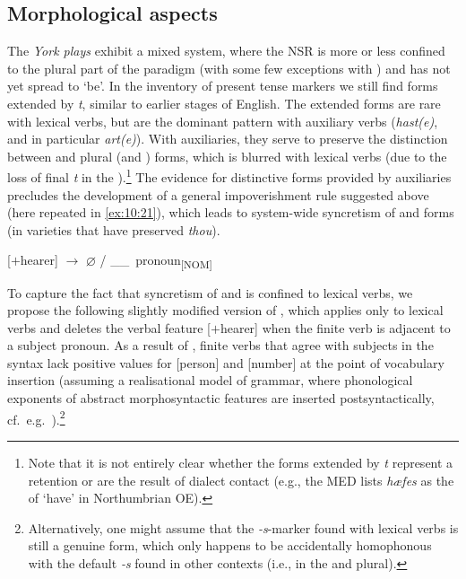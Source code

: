 \documentclass[output=paper]{langsci/langscibook}
\begin{document}
\subsection{Morphological aspects}
The \emph{York plays} exhibit a mixed system, where the \gls{NSR} is more or less confined to the plural part of the paradigm (with
some few exceptions with \Fsg{}) and has not yet spread to `be'. In the
inventory of present tense markers we still find \Ssg{} forms extended by
\emph{t}, similar to earlier stages of English. The extended forms are rare
with lexical verbs, but are the dominant pattern with auxiliary
verbs (\emph{hast(e)}, and in particular \emph{art(e)}). With auxiliaries, they
serve to preserve the distinction between \Ssg{} and plural (and \Tsg{}) forms,
which is blurred with lexical verbs (due to the loss of final \emph{t} in the
\Ssg{}).\footnote{Note that it is not entirely clear whether the \Ssg{} forms
extended by \emph{t} represent a retention or are the result of dialect contact
(e.g., the MED lists \emph{hæfes} as the \Ssg{} of `have' in Northumbrian
\gls{OE}).} The evidence for distinctive \Ssg{} forms provided by auxiliaries
precludes the development of a general impoverishment rule
suggested above (here repeated in \ref{ex:10:21}), which leads to system-wide syncretism
of \Ssg{} and \Tsg{} forms (in varieties that have preserved \emph{thou}).

\ea\label{ex:10:21}
\mbox{[$+$hearer]} {$\rightarrow$ $\varnothing$} / \_\_\ pronoun\textsubscript{[NOM]}
\z

To capture the fact that syncretism of \Ssg{} and \Tsg{} is confined to lexical
verbs, we propose the following slightly modified version of , which
applies only to lexical verbs and deletes the verbal  feature
[$+$hearer] when the finite verb is adjacent to a \Ssg{} subject pronoun. As a
result of , finite verbs that agree with \Ssg{} subjects in the syntax lack
positive values for [person] and [number] at the point of vocabulary insertion
(assuming a realisational model of grammar, where phonological exponents of
abstract morphosyntactic features are inserted postsyntactically, cf.\ e.g.\
\citealt{HalleMarantz1993}).\footnote{Alternatively, one might assume that the
\emph{-s}-marker found with \Ssg{} lexical verbs is still a genuine \Ssg{}
form, which only happens to be accidentally homophonous with the default
\emph{-s} found in other contexts (i.e., in the \Tsg{} and plural).}
\end{document}
